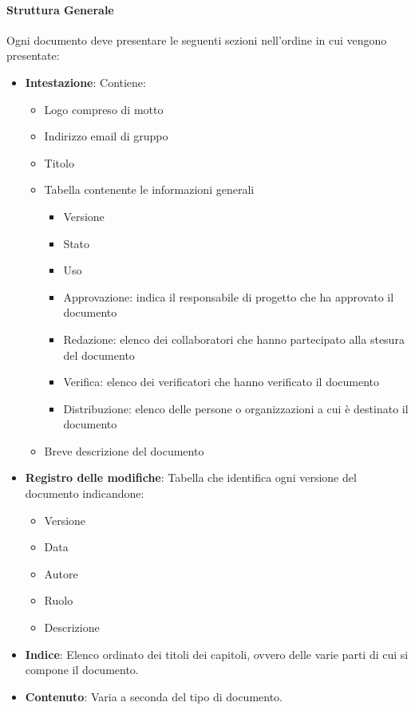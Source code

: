 \paragraph{Struttura Generale}
Ogni documento deve presentare le seguenti sezioni nell'ordine in cui vengono presentate:
\begin{itemize} 
    \item \textbf{Intestazione}:
    Contiene:
    \begin{itemize} 
        \item Logo compreso di motto
        \item Indirizzo email di gruppo 
        \item Titolo
        \item Tabella contenente le informazioni generali
        \begin{itemize}
            \item Versione
            \item Stato
            \item Uso
            \item Approvazione: indica il responsabile di progetto che ha approvato il documento 
            \item Redazione: elenco dei collaboratori che hanno partecipato alla stesura del documento
            \item Verifica: elenco dei verificatori che hanno verificato il documento
            \item Distribuzione: elenco delle persone o organizzazioni a cui è destinato il documento
        \end{itemize}
        \item Breve descrizione del documento 
    \end{itemize}
    \item \textbf{Registro delle modifiche}:
    Tabella che identifica ogni versione del documento indicandone:
    \begin{itemize} 
        \item Versione
        \item Data
        \item Autore
        \item Ruolo
        \item Descrizione
    \end{itemize}
    \item \textbf{Indice}:
    Elenco ordinato dei titoli dei capitoli, ovvero delle varie parti di cui si compone il documento.
    \item \textbf{Contenuto}:
    Varia a seconda del tipo di documento.
\end{itemize}

